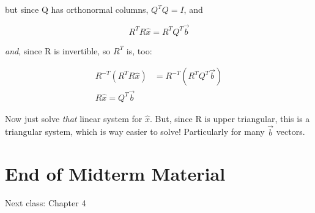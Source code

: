 \documentclass[twocolumn,draft]{article}
\begin{document}
 but since Q has orthonormal columns, $Q^{T}Q = I$, and
 
 \begin{equation}
 	R^{T}R\hat{x} = R^{T}Q^{T}\vec{b}
 \end{equation}
 
 \emph{and}, since R is invertible, so $R^{T}$ is, too:
 
 \begin{align*}
 	R^{-T}(R^{T}R\hat{x}) &= R^{-T}(R^{T}Q^{T}\vec{b}) \\
	\boxed{R\hat{x} = Q^{T}\vec{b}}
 \end{align*}
 
 Now just solve \emph{that} linear system for $\hat{x}$. But, since R is upper triangular,
 this is a triangular system, which is way easier to solve! Particularly for many $\vec{b}$
 vectors.
 
 \section*{End of Midterm Material}
 Next class: Chapter 4
 
 
 
\end{document}
